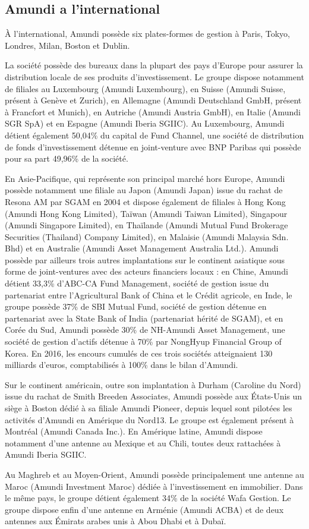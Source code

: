 \subsection{Amundi a l'international}
\par À l'international, Amundi possède six plates-formes de gestion à Paris, Tokyo, Londres, Milan, Boston et Dublin.
\par La société possède des bureaux dans la plupart des pays d'Europe pour assurer la distribution locale de ses produits d'investissement. Le groupe dispose notamment de filiales au Luxembourg (Amundi Luxembourg), en Suisse (Amundi Suisse, présent à Genève et Zurich), en Allemagne (Amundi Deutschland GmbH, présent à Francfort et Munich), en Autriche (Amundi Austria GmbH), en Italie (Amundi SGR SpA) et en Espagne (Amundi Iberia SGIIC). Au Luxembourg, Amundi détient également 50,04\% du capital de Fund Channel, une société de distribution de fonds d'investissement détenue en joint-venture avec BNP Paribas qui possède pour sa part 49,96\% de la société.
\par En Asie-Pacifique, qui représente son principal marché hors Europe, Amundi possède notamment une filiale au Japon (Amundi Japan) issue du rachat de Resona AM par SGAM en 2004 et dispose également de filiales à Hong Kong (Amundi Hong Kong Limited), Taïwan (Amundi Taiwan Limited), Singapour (Amundi Singapore Limited), en Thaïlande (Amundi Mutual Fund Brokerage Securities (Thailand) Company Limited), en Malaisie (Amundi Malaysia Sdn. Bhd) et en Australie (Amundi Asset Management Australia Ltd.). Amundi possède par ailleurs trois autres implantations sur le continent asiatique sous forme de joint-ventures avec des acteurs financiers locaux : en Chine, Amundi détient 33,3\% d'ABC-CA Fund Management, société de gestion issue du partenariat entre l'Agricultural Bank of China et le Crédit agricole, en Inde, le groupe possède 37\% de SBI Mutual Fund, société de gestion détenue en partenariat avec la State Bank of India (partenariat hérité de SGAM), et en Corée du Sud, Amundi possède 30\% de NH-Amundi Asset Management, une société de gestion d'actifs détenue à 70\% par NongHyup Financial Group of Korea. En 2016, les encours cumulés de ces trois sociétés atteignaient 130 milliards d'euros, comptabilisés à 100\% dans le bilan d'Amundi.
\par Sur le continent américain, outre son implantation à Durham (Caroline du Nord) issue du rachat de Smith Breeden Associates, Amundi possède aux États-Unis un siège à Boston dédié à sa filiale Amundi Pioneer, depuis lequel sont pilotées les activités d'Amundi en Amérique du Nord13. Le groupe est également présent à Montréal (Amundi Canada Inc.). En Amérique latine, Amundi dispose notamment d'une antenne au Mexique et au Chili, toutes deux rattachées à Amundi Iberia SGIIC.
\par Au Maghreb et au Moyen-Orient, Amundi possède principalement une antenne au Maroc (Amundi Investment Maroc) dédiée à l'investissement en immobilier. Dans le même pays, le groupe détient également 34\% de la société Wafa Gestion. Le groupe dispose enfin d'une antenne en Arménie (Amundi ACBA) et de deux antennes aux Émirats arabes unis à Abou Dhabi et à Dubaï.
